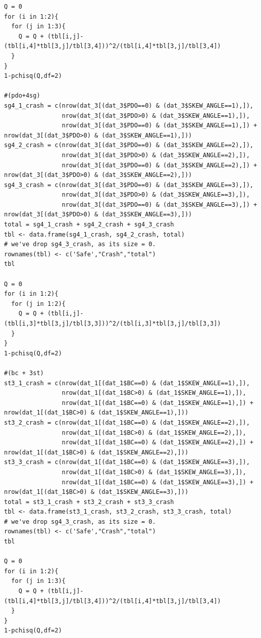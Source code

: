 \documentclass[11pt]{scrartcl} %
\begin{document}
\begin{lstlisting}
Q = 0
for (i in 1:2){
  for (j in 1:3){
    Q = Q + (tbl[i,j]-(tbl[i,4]*tbl[3,j]/tbl[3,4]))^2/(tbl[i,4]*tbl[3,j]/tbl[3,4])
  }
}
1-pchisq(Q,df=2)

#(pdo+4sg)
sg4_1_crash = c(nrow(dat_3[(dat_3$PDO==0) & (dat_3$SKEW_ANGLE==1),]),
                nrow(dat_3[(dat_3$PDO>0) & (dat_3$SKEW_ANGLE==1),]),
                nrow(dat_3[(dat_3$PDO==0) & (dat_3$SKEW_ANGLE==1),]) + nrow(dat_3[(dat_3$PDO>0) & (dat_3$SKEW_ANGLE==1),]))
sg4_2_crash = c(nrow(dat_3[(dat_3$PDO==0) & (dat_3$SKEW_ANGLE==2),]),
                nrow(dat_3[(dat_3$PDO>0) & (dat_3$SKEW_ANGLE==2),]),
                nrow(dat_3[(dat_3$PDO==0) & (dat_3$SKEW_ANGLE==2),]) + nrow(dat_3[(dat_3$PDO>0) & (dat_3$SKEW_ANGLE==2),]))
sg4_3_crash = c(nrow(dat_3[(dat_3$PDO==0) & (dat_3$SKEW_ANGLE==3),]),
                nrow(dat_3[(dat_3$PDO>0) & (dat_3$SKEW_ANGLE==3),]),
                nrow(dat_3[(dat_3$PDO==0) & (dat_3$SKEW_ANGLE==3),]) + nrow(dat_3[(dat_3$PDO>0) & (dat_3$SKEW_ANGLE==3),]))
total = sg4_1_crash + sg4_2_crash + sg4_3_crash
tbl <- data.frame(sg4_1_crash, sg4_2_crash, total)
# we've drop sg4_3_crash, as its size = 0.
rownames(tbl) <- c('Safe',"Crash","total")
tbl

Q = 0
for (i in 1:2){
  for (j in 1:2){
    Q = Q + (tbl[i,j]-(tbl[i,3]*tbl[3,j]/tbl[3,3]))^2/(tbl[i,3]*tbl[3,j]/tbl[3,3])
  }
}
1-pchisq(Q,df=2)

#(bc + 3st)
st3_1_crash = c(nrow(dat_1[(dat_1$BC==0) & (dat_1$SKEW_ANGLE==1),]),
                nrow(dat_1[(dat_1$BC>0) & (dat_1$SKEW_ANGLE==1),]),
                nrow(dat_1[(dat_1$BC==0) & (dat_1$SKEW_ANGLE==1),]) + nrow(dat_1[(dat_1$BC>0) & (dat_1$SKEW_ANGLE==1),]))
st3_2_crash = c(nrow(dat_1[(dat_1$BC==0) & (dat_1$SKEW_ANGLE==2),]),
                nrow(dat_1[(dat_1$BC>0) & (dat_1$SKEW_ANGLE==2),]),
                nrow(dat_1[(dat_1$BC==0) & (dat_1$SKEW_ANGLE==2),]) + nrow(dat_1[(dat_1$BC>0) & (dat_1$SKEW_ANGLE==2),]))
st3_3_crash = c(nrow(dat_1[(dat_1$BC==0) & (dat_1$SKEW_ANGLE==3),]),
                nrow(dat_1[(dat_1$BC>0) & (dat_1$SKEW_ANGLE==3),]),
                nrow(dat_1[(dat_1$BC==0) & (dat_1$SKEW_ANGLE==3),]) + nrow(dat_1[(dat_1$BC>0) & (dat_1$SKEW_ANGLE==3),]))
total = st3_1_crash + st3_2_crash + st3_3_crash
tbl <- data.frame(st3_1_crash, st3_2_crash, st3_3_crash, total)
# we've drop sg4_3_crash, as its size = 0.
rownames(tbl) <- c('Safe',"Crash","total")
tbl

Q = 0
for (i in 1:2){
  for (j in 1:3){
    Q = Q + (tbl[i,j]-(tbl[i,4]*tbl[3,j]/tbl[3,4]))^2/(tbl[i,4]*tbl[3,j]/tbl[3,4])
  }
}
1-pchisq(Q,df=2)


\end{lstlisting}
\end{document}
